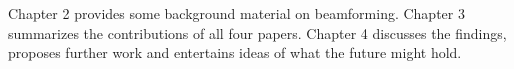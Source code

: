 Chapter 2 provides some background material on beamforming. Chapter 3 summarizes the contributions of all four papers. Chapter 4 discusses the findings, proposes further work and entertains ideas of what the future might hold.

%
%      
%   
%   
%
%
%   
%
%      
%
%
%    
%   
%   
%   
%   

